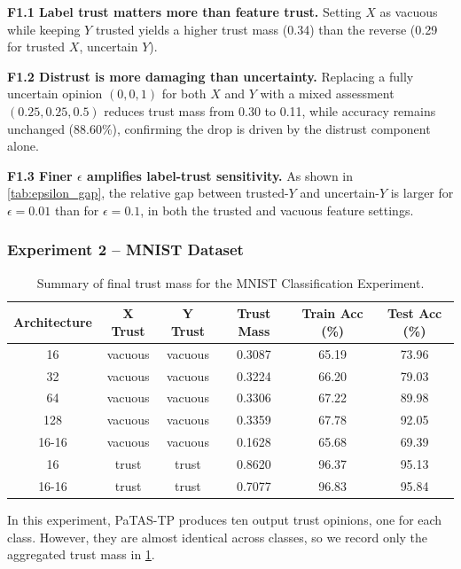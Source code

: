 \begin{tcolorbox}[title=Key findings -- Experiment 1, colback=gray!5, colframe=gray!40, fonttitle=\bfseries, left=4pt, right=4pt, top=4pt, bottom=4pt]
\textbf{F1.1 Label trust matters more than feature trust.} Setting $X$ as vacuous
while keeping $Y$ trusted yields a higher trust mass (0.34) than the reverse
(0.29 for trusted $X$, uncertain $Y$).

\medskip
\textbf{F1.2 Distrust is more damaging than uncertainty.} Replacing a fully
uncertain opinion $(0,0,1)$ for both $X$ and $Y$ with a mixed assessment
$(0.25, 0.25, 0.5)$ reduces trust mass from 0.30 to 0.11, while accuracy
remains unchanged (88.60\%), confirming the drop is driven by the distrust
component alone.

\medskip
\textbf{F1.3 Finer $\epsilon$ amplifies label-trust sensitivity.} As shown in
\cref{tab:epsilon_gap}, the relative gap between trusted-$Y$ and uncertain-$Y$
is larger for $\epsilon=0.01$ than for $\epsilon=0.1$, in both the trusted and
vacuous feature settings.
\end{tcolorbox}














\subsubsection*{Experiment 2 -- MNIST Dataset}
\begin{table}
\centering
\begin{tabular}{cccccc}
\hline
Architecture & X Trust & Y Trust & Trust Mass & Train Acc (\%) & Test Acc (\%) \\
\hline
16 & vacuous & vacuous & 0.3087 & 65.19 & 73.96 \\
32 & vacuous & vacuous & 0.3224 & 66.20 & 79.03 \\
64 & vacuous & vacuous & 0.3306 & 67.22 & 89.98 \\
128 & vacuous & vacuous & 0.3359 & 67.78 & 92.05 \\
16-16 & vacuous & vacuous & 0.1628 & 65.68 & 69.39 \\
16 & trust & trust & 0.8620 & 96.37 & 95.13 \\
16-16 & trust & trust & 0.7077 & 96.83 & 95.84 \\
\hline
\end{tabular}
\caption{Summary of final trust mass for the MNIST Classification Experiment.}
\label{tab:mnist}
\end{table}
In this experiment, \ac{PaTAS-TP} produces ten output trust opinions, one for each class. However, they are almost identical across classes, so we record only the aggregated trust mass in \cref{tab:mnist}.

